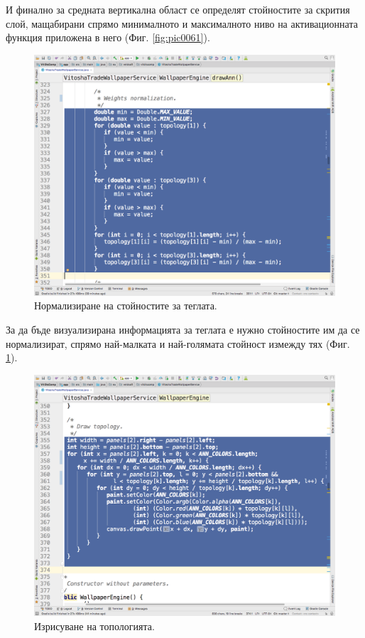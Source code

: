 \documentclass[book,14pt,oneside,openany]{memoir}
\begin{document}
И финално за средната вертикална област се определят стойностите за скрития слой, мащабирани спрямо минималното и максималното ниво на активационната функция приложена в него (Фиг. \ref{fig:pic0061}).

\begin{figure}[h]
  \centering
  \includegraphics[height=0.45\pdfpageheight]{./images/pic0062.png}
  \caption{Нормализиране на стойностите за теглата.}
\label{fig:pic0062}
\end{figure}
\FloatBarrier

За да бъде визуализирана информацията за теглата е нужно стойностите им да се нормализират, спрямо най-малката и най-голямата стойност измежду тях (Фиг. \ref{fig:pic0062}).

\begin{figure}[h]
  \centering
  \includegraphics[height=0.45\pdfpageheight]{./images/pic0063.png}
  \caption{Изрисуване на топологията.}
\label{fig:pic0063}
\end{figure}
\FloatBarrier
\end{document}
